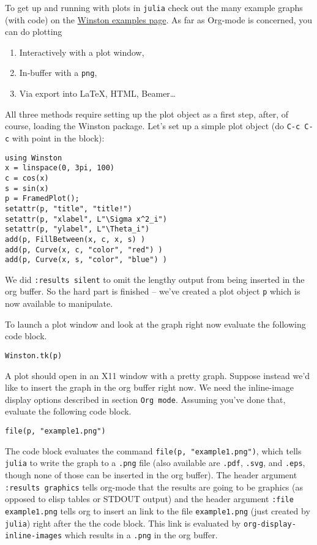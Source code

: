 \documentclass[11pt]{article}
\begin{document}
To get up and running with plots in \texttt{julia} check out the many example
graphs (with code) on the \href{https://github.com/nolta/Winston.jl/blob/master/doc/examples.md}{Winston examples page}. As far as Org-mode is
concerned, you can do plotting

\begin{enumerate}
\item Interactively with a plot window,
\item In-buffer with a \texttt{png},
\item Via export into \LaTeX{}, HTML, Beamer\ldots{}
\end{enumerate}

All three methods require setting up the plot object as a first step,
after, of course, loading the Winston package.  Let's set up a simple
plot object (do \texttt{C-c C-c} with point in the block):

\begin{verbatim}
using Winston
x = linspace(0, 3pi, 100)
c = cos(x)
s = sin(x)
p = FramedPlot();
setattr(p, "title", "title!")
setattr(p, "xlabel", L"\Sigma x^2_i")
setattr(p, "ylabel", L"\Theta_i")
add(p, FillBetween(x, c, x, s) )
add(p, Curve(x, c, "color", "red") )
add(p, Curve(x, s, "color", "blue") )
\end{verbatim}

We did \texttt{:results silent} to omit the lengthy output from being
inserted in the org buffer.  So the hard part is finished -- we've
created a plot object \texttt{p} which is now available to manipulate.

To launch a plot window and look at the graph right now evaluate the
following code block.

\begin{verbatim}
Winston.tk(p)
\end{verbatim}

A plot should open in an X11 window with a pretty graph. Suppose
instead we'd like to insert the graph in the org buffer right now. We
need the inline-image display options described in section \texttt{Org
mode}. Assuming you've done that, evaluate the following code block.

\begin{verbatim}
file(p, "example1.png")
\end{verbatim}

The code block evaluates the command \texttt{file(p, "example1.png")}, which
tells \texttt{julia} to write the graph to a \texttt{.png} file (also available are
\texttt{.pdf}, \texttt{.svg}, and \texttt{.eps}, though none of those can be inserted in
the org buffer).  The header argument \texttt{:results graphics} tells
org-mode that the results are going to be graphics (as opposed to
elisp tables or STDOUT output) and the header argument \texttt{:file
example1.png} tells org to insert an link to the file \texttt{example1.png}
(just created by \texttt{julia}) right after the the code block.  This link
is evaluated by \texttt{org-display-inline-images} which results in a \texttt{.png}
in the org buffer.
\end{document}
